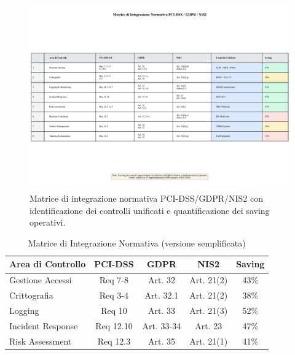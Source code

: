 \begin{figure}[htbp]
\centering
\includegraphics[width=\textwidth]{thesis_figures/cap4/tabella_4_1_matrice_integrazione.pdf}
\caption{Matrice di integrazione normativa PCI-DSS/GDPR/NIS2 con identificazione dei controlli unificati e quantificazione dei saving operativi.}
\label{tab:matrice_integrazione}
\end{figure}

\begin{table}[htbp]
\centering
\caption{Matrice di Integrazione Normativa (versione semplificata)}
\label{tab:integration_matrix_native}
\begin{tabular}{@{}lcccc@{}}
\toprule
\textbf{Area di Controllo} & \textbf{PCI-DSS} & \textbf{GDPR} & \textbf{NIS2} & \textbf{Saving} \\
\midrule
Gestione Accessi & Req 7-8 & Art. 32 & Art. 21(2) & 43\% \\
Crittografia & Req 3-4 & Art. 32.1 & Art. 21(2) & 38\% \\
Logging & Req 10 & Art. 33 & Art. 21(3) & 52\% \\
Incident Response & Req 12.10 & Art. 33-34 & Art. 23 & 47\% \\
Risk Assessment & Req 12.3 & Art. 35 & Art. 21(1) & 41\% \\
\bottomrule
\end{tabular}
\end{table}

